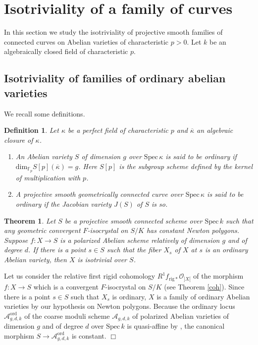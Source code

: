 \documentclass[11pt]{amsart}
\newtheorem{theorem}[Lemma]{Theorem}
\newtheorem{definition}[Lemma]{Definition}
\begin{document}
\section{Isotriviality of a family of curves} 

In this section we study the isotriviality of projective smooth families of connected  
curves on Abelian varieties of characteristic $p > 0$. 
Let $k$ be an algebraically closed field of characteristic $p$. 

\subsection{Isotriviality of families of ordinary abelian varieties}

We recall some definitions.

\begin{definition}\label{ordi} 
Let $\kappa$ be a perfect field of characteristic $p$ and $\overline{\kappa}$ an algebraic closure of $\kappa$. 
\begin{enumerate}
\item An Abelian variety $S$ of dimension $g$ over $\mathrm{Spec}\, \kappa$ 
is said to be ordinary if $\mathrm{dim}_{\mathbb F_p}S[p](\overline{\kappa}) = g$. 
Here $S[p]$ is the subgroup scheme defined by the kernel of multiplication with $p$. 
\item A projective smooth geometrically connected curve over $\mathrm{Spec}\, \kappa$ 
is said to be ordinary if the Jacobian variety $J(S)$ of $S$ is so.
\end{enumerate}
\end{definition}

\begin{theorem}\label{isNP}  Let $S$ be 
a projective smooth connected scheme over $\mathrm{Spec}\, k$ such that 
any geometric convergent $F$-isocrystal on $S/K$ has constant Newton polygons. 
Suppose $f : X \rightarrow S$ is a polarized Abelian scheme relatively 
of dimension $g$ and of degree $d$.  
If there is a point $s \in S$ such that the fiber $X_s$ of $X$ at $s$ is an ordinary Abelian variety, 
then $X$ is isotrivial over $S$. 
\end{theorem}

{ {Let us consider the relative first rigid cohomology $R^1f_{\mathrm{rig} \ast}\mathcal O_{]X[}$ 
of the morphism $f : X \rightarrow S$ which is a convergent 
$F$-isocrystal on $S/K$ (see Theorem \ref{coh}). Since there is a point $s \in S$ such that $X_s$ is ordinary, 
$X$ is a family of ordinary Abelian varieties by our hypothesis on Newton polygons. 
Because the ordinary locus $\mathcal A_{g, d, k}^{\mathrm{ord}}$ of the coarse moduli scheme 
$\mathcal A_{g, d, k}$ of 
polarized Abelian varieties of dimension $g$ and of degree $d$ 
over $\mathrm{Spec}\, k$ is quasi-affine by \cite[XI, Th\'eor\`eme 5.2]{MB}, 
the canonical morphism $S \rightarrow \mathcal A_{g, d, k}^{\mathrm{ord}}$ is constant.} \hspace*{\fill} $\Box$}
\end{document}
